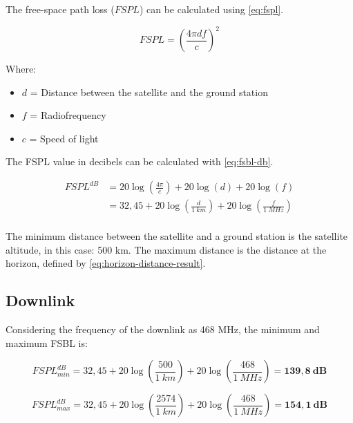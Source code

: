 The free-space path loss ($FSPL$) can be calculated using \autoref{eq:fspl}.

\begin{equation} \label{eq:fspl}
FSPL = \left( \frac{4\pi d f}{c} \right)^{2}
\end{equation}

Where:

\begin{itemize}
    \item $d$ = Distance between the satellite and the ground station
    \item $f$ = Radiofrequency
    \item $c$ = Speed of light
\end{itemize}

The FSPL value in decibels can be calculated with \autoref{eq:fsbl-db}.

\begin{equation} \label{eq:fsbl-db}
    \begin{split}
        FSPL^{dB} & = 20\log\left(\frac{4\pi}{c}\right) + 20\log\left(d\right) + 20\log\left(f\right) \\
                  & = 32,45 + 20\log\left(\frac{d}{1\ km}\right) + 20\log\left(\frac{f}{1\ MHz}\right) \\
    \end{split}
\end{equation}

The minimum distance between the satellite and a ground station is the satellite altitude, in this case: 500 km. The maximum distance is the distance at the horizon, defined by \autoref{eq:horizon-distance-result}.

\subsection{Downlink}

Considering the frequency of the downlink as 468 MHz, the minimum and maximum FSBL is:

\begin{equation}
    FSPL^{dB}_{min} = 32,45 + 20\log\left(\frac{500}{1\ km}\right) + 20\log\left(\frac{468}{1\ MHz}\right) = \mathbf{139,8\ dB}
\end{equation}

\begin{equation}
    FSPL^{dB}_{max} = 32,45 + 20\log\left(\frac{2574}{1\ km}\right) + 20\log\left(\frac{468}{1\ MHz}\right) = \mathbf{154,1\ dB}
\end{equation}

